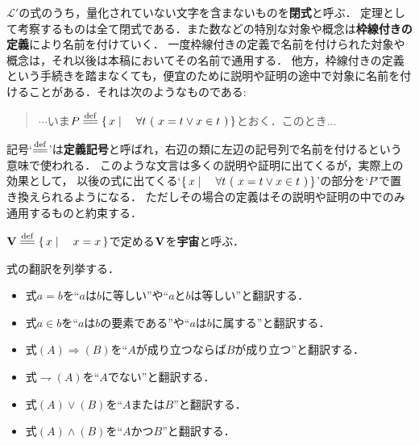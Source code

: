 	$\mathcal{L}'$の式のうち，量化されていない文字を含まないものを{\bf 閉式}と呼ぶ．
	定理として考察するものは全て閉式である．また数などの特別な対象や概念は{\bf 枠線付きの定義}により名前を付けていく．
	一度枠線付きの定義で名前を付けられた対象や概念は，それ以後は本稿においてその名前で通用する．
	他方，枠線付きの定義という手続きを踏まなくても，便宜のために説明や証明の途中で対象に名前を付けることがある．それは次のようなものである: 
	\begin{quote}
		$\cdots$いま$P \defeq \Set{x}{\forall t\ (\ x = t \vee x \in t\ )}$とおく．このとき...
	\end{quote}
	記号`$\defeq$'は{\bf 定義記号}と呼ばれ，右辺の類に左辺の記号列で名前を付けるという意味で使われる．
	このような文言は多くの説明や証明に出てくるが，実際上の効果として，
	以後の式に出てくる`$\Set{x}{\forall t\ (\ x = t \vee x \in t\ )}$'の部分を`$P$'で置き換えられるようになる．
	ただしその場合の定義はその説明や証明の中でのみ通用するものと約束する．
	
	\begin{screen}
		\begin{dfn}[宇宙]
			$\Univ \defeq \Set{x}{x=x}$で定める$\mathbf{V}$を{\bf 宇宙}と呼ぶ．
		\end{dfn}
	\end{screen}
	
	
	式の翻訳を列挙する．
	\begin{itemize}
		\item 式$a = b$を``$a$は$b$に等しい''や``$a$と$b$は等しい''と翻訳する．
		\item 式$a \in b$を``$a$は$b$の要素である''や``$a$は$b$に属する''と翻訳する．
		\item 式$(A) \Longrightarrow (B)$を``$A$が成り立つならば$B$が成り立つ''と翻訳する．
		\item 式$\rightharpoondown (A)$を``$A$でない''と翻訳する．
		\item 式$(A) \vee (B)$を``$A$または$B$''と翻訳する．
		\item 式$(A) \wedge (B)$を``$A$かつ$B$''と翻訳する．
	\end{itemize}
	

